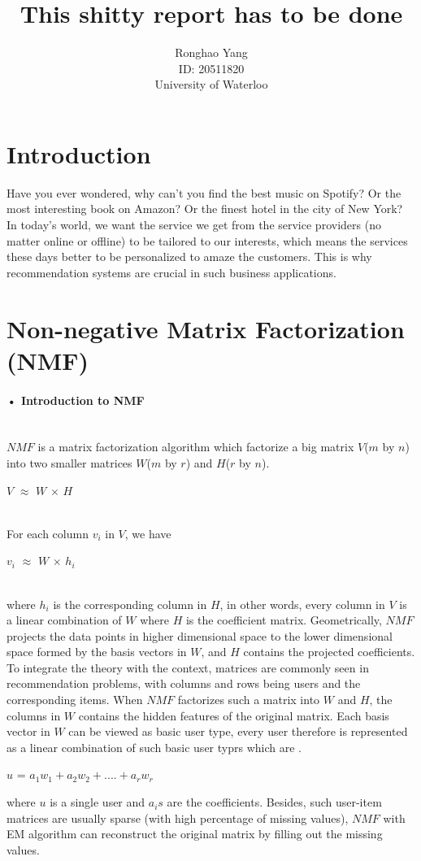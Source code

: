 \documentclass[11pt]{article} %
\title{This shitty report has to be done}
\author{Ronghao Yang\\ID: 20511820\\University of Waterloo}
\begin{document}
\maketitle

\begin{abstract}

\end{abstract}
\section{Introduction}
Have you ever wondered, why can't you find the best music on Spotify? Or the most interesting book on Amazon? Or the finest hotel in the city of New York? In today's world, we want the service we get from the service providers (no matter online or offline) to be tailored to our interests, which means the services these days better to be personalized to amaze the customers. This is why recommendation systems are crucial in such business applications.\\

\section{Non-negative Matrix Factorization (NMF)}
\paragraph{• Introduction to NMF}\mbox{}\\
$NMF$ is a matrix factorization algorithm which factorize a big matrix $V$($m$ by $n$) into two smaller matrices $W$($m$ by $r$) and $H$($r$ by $n$). \\
\centerline{$V$ $\approx$ $W$ $\times$ $H$}\\
For each column $v_{i}$ in $V$, we have\\
\centerline{$v_{i}$ $\approx$ $W$ $\times$ $h_{i}$}\\
where $h_{i}$ is the corresponding column in $H$, in other words, every column in $V$ is a linear combination of $W$ where $H$ is the coefficient matrix. Geometrically, $NMF$ projects the data points in higher dimensional space to the lower dimensional space formed by the basis vectors in $W$, and $H$ contains the projected coefficients.\\
To integrate the theory with the context, matrices are commonly seen in recommendation problems, with columns and rows being users and the corresponding items. When $NMF$ factorizes such a matrix into $W$ and $H$, the columns in $W$ contains the hidden features of the original matrix. Each basis vector in $W$ can be viewed as basic user type, every user therefore is represented as a linear combination of such basic user typrs which are .\\
\centerline{$u$ = $a_1w_1+a_2w_2+....+a_rw_r$}
where $u$ is a single user and $a_is$ are the coefficients.
Besides, such user-item matrices are usually sparse (with high percentage of missing values), $NMF$ with EM algorithm can reconstruct the original matrix by filling out the missing values.\\
\end{document}
